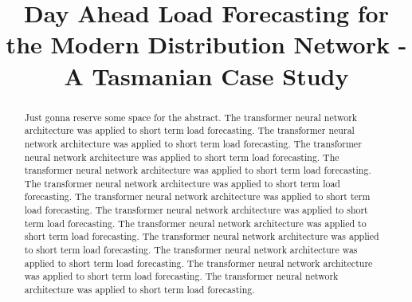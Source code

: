 \documentclass[conference]{IEEEtran}
\begin{document}
\title{Day Ahead Load Forecasting for the Modern Distribution Network - A Tasmanian Case Study}

\author{
\and
{}
\and
{}
\and
{}
}

\maketitle

\begin{abstract}
Just gonna reserve some space for the abstract.
The transformer neural network architecture was applied to short term load forecasting.
The transformer neural network architecture was applied to short term load forecasting.
The transformer neural network architecture was applied to short term load forecasting.
The transformer neural network architecture was applied to short term load forecasting.
The transformer neural network architecture was applied to short term load forecasting.
The transformer neural network architecture was applied to short term load forecasting.
The transformer neural network architecture was applied to short term load forecasting.
The transformer neural network architecture was applied to short term load forecasting.
The transformer neural network architecture was applied to short term load forecasting.
The transformer neural network architecture was applied to short term load forecasting.
The transformer neural network architecture was applied to short term load forecasting.
The transformer neural network architecture was applied to short term load forecasting.
\end{abstract}
\end{document}
